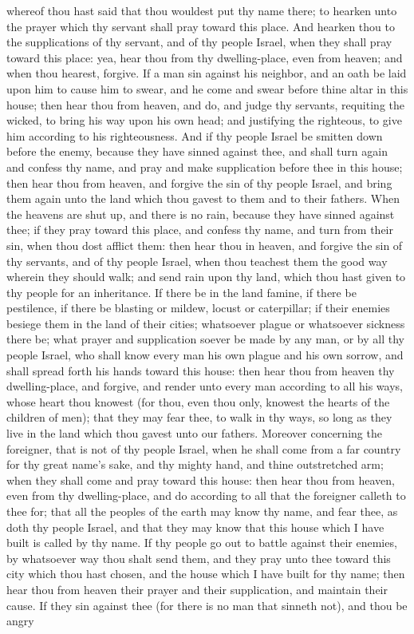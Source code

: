 whereof thou hast said that thou wouldest put thy name there; to hearken unto the prayer which thy servant shall pray toward this place. And hearken thou to the supplications of thy servant, and of thy people Israel, when they shall pray toward this place: yea, hear thou from thy dwelling-place, even from heaven; and when thou hearest, forgive.  If a man sin against his neighbor, and an oath be laid upon him to cause him to swear, and he come and swear before thine altar in this house; then hear thou from heaven, and do, and judge thy servants, requiting the wicked, to bring his way upon his own head; and justifying the righteous, to give him according to his righteousness.  And if thy people Israel be smitten down before the enemy, because they have sinned against thee, and shall turn again and confess thy name, and pray and make supplication before thee in this house; then hear thou from heaven, and forgive the sin of thy people Israel, and bring them again unto the land which thou gavest to them and to their fathers.  When the heavens are shut up, and there is no rain, because they have sinned against thee; if they pray toward this place, and confess thy name, and turn from their sin, when thou dost afflict them: then hear thou in heaven, and forgive the sin of thy servants, and of thy people Israel, when thou teachest them the good way wherein they should walk; and send rain upon thy land, which thou hast given to thy people for an inheritance.  If there be in the land famine, if there be pestilence, if there be blasting or mildew, locust or caterpillar; if their enemies besiege them in the land of their cities; whatsoever plague or whatsoever sickness there be; what prayer and supplication soever be made by any man, or by all thy people Israel, who shall know every man his own plague and his own sorrow, and shall spread forth his hands toward this house: then hear thou from heaven thy dwelling-place, and forgive, and render unto every man according to all his ways, whose heart thou knowest (for thou, even thou only, knowest the hearts of the children of men); that they may fear thee, to walk in thy ways, so long as they live in the land which thou gavest unto our fathers.  Moreover concerning the foreigner, that is not of thy people Israel, when he shall come from a far country for thy great name’s sake, and thy mighty hand, and thine outstretched arm; when they shall come and pray toward this house: then hear thou from heaven, even from thy dwelling-place, and do according to all that the foreigner calleth to thee for; that all the peoples of the earth may know thy name, and fear thee, as doth thy people Israel, and that they may know that this house which I have built is called by thy name.  If thy people go out to battle against their enemies, by whatsoever way thou shalt send them, and they pray unto thee toward this city which thou hast chosen, and the house which I have built for thy name; then hear thou from heaven their prayer and their supplication, and maintain their cause.  If they sin against thee (for there is no man that sinneth not), and thou be angry 